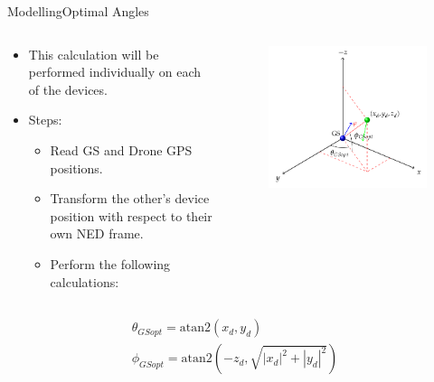\begin{frame}{Modelling}{Optimal Angles}
\begin{columns}[T]
    \begin{column}{.5\textwidth}
      \begin{block}{}
        \begin{itemize}
          \item {This calculation will be performed individually on each of the devices.}
          \item {Steps:}
          \begin{itemize}
          \item{Read GS and Drone GPS positions.}
          \item{Transform the other's device position with respect to their own NED frame.}
          \item{Perform the following calculations:}
          \end{itemize}
        \end{itemize}
      \end{block}
    \end{column}

    \begin{column}{.5\textwidth}
    \begin{figure}[H]
    \includegraphics[scale=0.27]{figures/optimal.png}
    \end{figure}
    \end{column}
  \end{columns}
      \begin{align*}      
         \theta_{GSopt} = \text{atan2}\left(x_{d}, y_{d}\right) \nonumber \\
  \phi_{GSopt}=  \text{atan2}\left(-z_{d}, \sqrt{|x_{d}|^{2}+|y_{d}|^{2}}\right)
        \end{align*}
\end{frame}